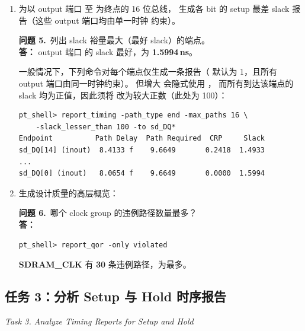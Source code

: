 \begin{enumerate}
  \item 为以 output 端口  至  为终点的 16 位总线，
        生成各 bit 的 setup 最差 slack 报告（这些 output 端口均由单一时钟  约束）。

\begin{questionBox}
\textbf{问题 5.}\ 列出 slack 裕量最大（最好 slack）的端点。\\[0.35em]
\textbf{答：} output 端口  的 slack 最好，为 \textbf{1.5994\,ns}。

一般情况下，下列命令对每个端点仅生成一条报告（ 默认为 1，且所有 output 端口由同一时钟约束）。
但增大  会隐式使用 ，
而所有到达该端点的 slack 均为正值，因此须将  改为较大正数（此处为 100）：
\begin{lstlisting}
pt_shell> report_timing -path_type end -max_paths 16 \
    -slack_lesser_than 100 -to sd_DQ*
Endpoint          Path Delay  Path Required  CRP     Slack
sd_DQ[14] (inout)  8.4133 f    9.6649       0.2418  1.4933
...
sd_DQ[0] (inout)   8.0654 f    9.6649       0.0000  1.5994
\end{lstlisting}
\end{questionBox}

  \item 生成设计质量的高层概览：

\begin{questionBox}
\textbf{问题 6.}\ 哪个 clock group 的违例路径数量最多？\\[0.35em]
\textbf{答：}\\
\begin{lstlisting}
pt_shell> report_qor -only violated
\end{lstlisting}
\textbf{SDRAM\_CLK} 有 \textbf{30} 条违例路径，为最多。
\end{questionBox}
\end{enumerate}

\subsection{任务 3：分析 Setup 与 Hold 时序报告}
\label{lab3:task3}

\noindent\textit{Task 3. Analyze Timing Reports for Setup and Hold}


